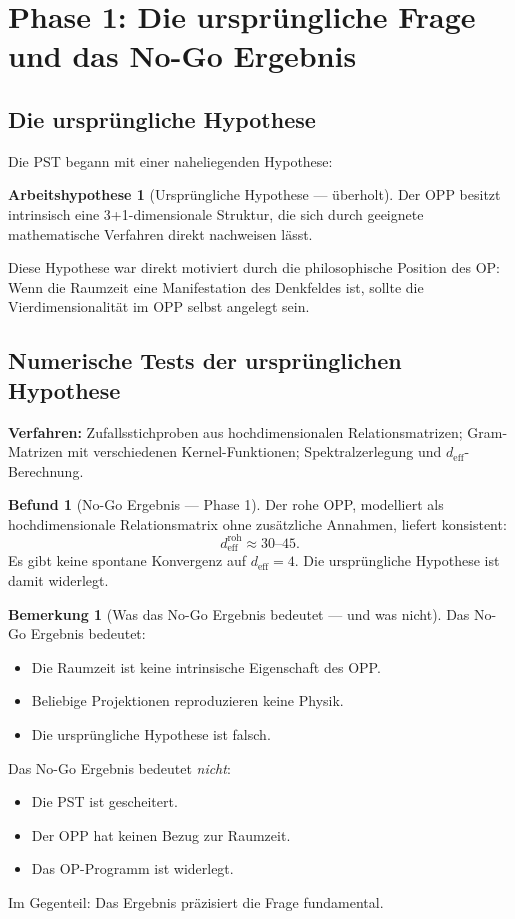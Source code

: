 \documentclass[11pt,a4paper]{article}
\theoremstyle{plain}
\theoremstyle{definition}
\newtheorem{remark}{Bemerkung}[section]
\newtheorem{befund}{Befund}[section]
\newtheorem{hypothese}{Arbeitshypothese}[section]
\newcommand{\deff}{d_{\mathrm{eff}}}
\begin{document}
\section{Phase 1: Die urspr\"{u}ngliche Frage und das No-Go Ergebnis}

\subsection{Die urspr\"{u}ngliche Hypothese}

Die PST begann mit einer naheliegenden Hypothese:

\begin{hypothese}[Urspr\"{u}ngliche Hypothese --- \"{u}berholt]
Der OPP besitzt intrinsisch eine 3+1-dimensionale Struktur, die sich
durch geeignete mathematische Verfahren direkt nachweisen l\"{a}sst.
\end{hypothese}

Diese Hypothese war direkt motiviert durch die philosophische Position
des OP: Wenn die Raumzeit eine Manifestation des Denkfeldes ist, sollte
die Vierdimensionalit\"{a}t im OPP selbst angelegt sein.

\subsection{Numerische Tests der urspr\"{u}nglichen Hypothese}

\textbf{Verfahren:} Zufallsstichproben aus hochdimensionalen
Relationsmatrizen; Gram-Matrizen mit verschiedenen Kernel-Funktionen;
Spektralzerlegung und $\deff$-Berechnung.

\begin{befund}[No-Go Ergebnis --- Phase 1]
Der rohe OPP, modelliert als hochdimensionale Relationsmatrix ohne
zus\"{a}tzliche Annahmen, liefert konsistent:
\[
  \deff^{\text{roh}} \approx 30\text{--}45.
\]
Es gibt keine spontane Konvergenz auf $\deff = 4$. Die urspr\"{u}ngliche
Hypothese ist damit widerlegt.
\end{befund}

\begin{remark}[Was das No-Go Ergebnis bedeutet --- und was nicht]
Das No-Go Ergebnis bedeutet:
\begin{itemize}
  \item Die Raumzeit ist keine intrinsische Eigenschaft des OPP.
  \item Beliebige Projektionen reproduzieren keine Physik.
  \item Die urspr\"{u}ngliche Hypothese ist falsch.
\end{itemize}
Das No-Go Ergebnis bedeutet \emph{nicht}:
\begin{itemize}
  \item Die PST ist gescheitert.
  \item Der OPP hat keinen Bezug zur Raumzeit.
  \item Das OP-Programm ist widerlegt.
\end{itemize}
Im Gegenteil: Das Ergebnis pr\"{a}zisiert die Frage fundamental.
\end{remark}
\end{document}
